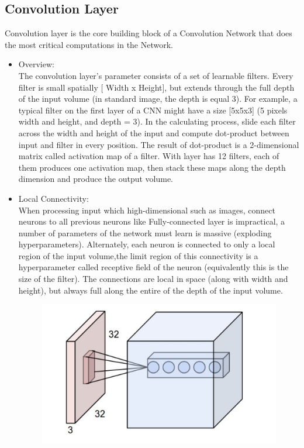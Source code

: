 \vspace{-1cm}
\subsection{Convolution Layer}
Convolution layer is the core building block of a Convolution Network that does the most critical computations in the Network.
\begin{itemize}
	\item Overview:\\ 
	The convolution layer's parameter consists of a set of learnable filters. Every filter is small spatially [ Width x Height], but extends through the full depth of the input volume (in standard image, the depth is equal 3). For example, a typical filter on the first layer of a CNN might have a size [5x5x3] (5 pixels width and height, and depth = 3). In the calculating process, slide each filter across the width and height of the input and compute dot-product between input and filter in every position. The result of dot-product is a 2-dimensional matrix called activation map of a filter. With layer has 12 filters, each of them produces one activation map, then stack these maps along the depth dimension and produce the output volume.
	\item Local Connectivity:\\
	When processing input which high-dimensional such as images, connect neurons to all previous neurons like Fully-connected layer is impractical, a number of parameters of the network must learn is massive (exploding hyperparameters). Alternately, each neuron is connected to only a local region of the input volume,the limit region of this connectivity is a hyperparameter called receptive field of the neuron (equivalently this is the size of the filter). The connections are local in space (along with width and height), but always full along the entire of the depth of the input volume.
	\begin{center}
		\begin{figure}[H]
			\centering
			\includegraphics[width=1\columnwidth]{images/chap2/LocalConnectivity.png}

\end{figure}
\end{center}
\end{itemize}
